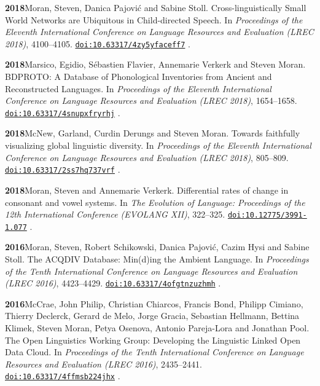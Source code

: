 \documentclass[11pt]{article}
\newcommand{\hangpara}{
 \setlength{\parindent}{0in} %
 \hangindent=0.42in %
}
\newcommand{\doi}[1]{%
  \href{https://doi.org/#1}{\nolinkurl{doi:#1}}%
}
\begin{document}
\vskip 6pt
\hangpara
{\bf 2018}\hspace{1ex}Moran, Steven, Danica Pajovi{\'c} and Sabine Stoll. Cross-linguistically Small World Networks are Ubiquitous in Child-directed Speech. In {\it Proceedings of the Eleventh International Conference on Language Resources and Evaluation (LREC 2018)}, 4100--4105. \doi{10.63317/4zy5yfaceff7}.

\vskip 6pt
\hangpara
{\bf 2018}\hspace{1ex}Marsico, Egidio, Sébastien Flavier, Annemarie Verkerk and Steven Moran. BDPROTO: A Database of Phonological Inventories from Ancient and Reconstructed Languages. In {\it Proceedings of the Eleventh International Conference on Language Resources and Evaluation (LREC 2018)}, 1654--1658. \doi{10.63317/4snupxfryrhj}.

\vskip 6pt
\hangpara
{\bf 2018}\hspace{1ex}McNew, Garland, Curdin Derungs and Steven Moran. Towards faithfully visualizing global linguistic diversity. In {\it Proceedings of the Eleventh International Conference on Language Resources and Evaluation (LREC 2018)}, 805--809. \doi{10.63317/2ss7hq737vrf}.

\vskip 6pt
\hangpara
{\bf 2018}\hspace{1ex}Moran, Steven and Annemarie Verkerk. Differential rates of change in consonant and vowel systems. In {\it The Evolution of Language: Proceedings of the 12th International Conference (EVOLANG XII)}, 322--325. \doi{10.12775/3991-1.077}.

\vskip 6pt
\hangpara
{\bf 2016}\hspace{1ex}Moran, Steven, Robert Schikowski, Danica Pajovi{\'c}, Cazim Hysi and Sabine Stoll. The ACQDIV Database: Min(d)ing the Ambient Language. In {\it Proceedings of the Tenth International Conference on Language Resources and Evaluation (LREC 2016)}, 4423--4429. \doi{10.63317/4ofgtnzuzhmh}.

\vskip 6pt
\hangpara
{\bf 2016}\hspace{1ex}McCrae, John Philip, Christian Chiarcos, Francis Bond, Philipp Cimiano, Thierry Declerck, Gerard de Melo, Jorge Gracia, Sebastian Hellmann, Bettina Klimek, Steven Moran, Petya Osenova, Antonio Pareja-Lora and Jonathan Pool. The Open Linguistics Working Group: Developing the Linguistic Linked Open Data Cloud. In {\it Proceedings of the Tenth International Conference on Language Resources and Evaluation (LREC 2016)}, 2435--2441. \doi{10.63317/4ffmsb224jhx}.
\end{document}
